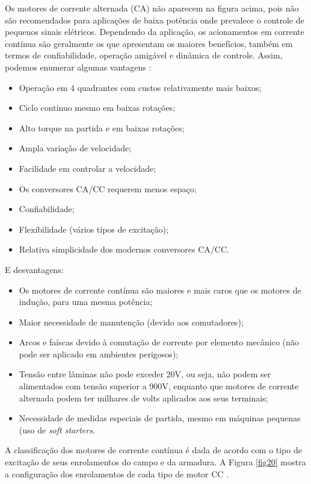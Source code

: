 \begin{anexosenv}
Os motores de corrente alternada (CA) não aparecem na figura acima, pois não são recomendados para aplicações de baixa potência onde prevalece o controle de pequenos sinais elétricos. Dependendo da aplicação, os acionamentos em corrente contínua são geralmente os que apresentam os maiores benefícios, também em termos de confiabilidade, operação amigável e dinâmica de controle. Assim, podemos enumerar algumas vantagens \cite{siemens}:
\begin{itemize}
	\item Operação em 4 quadrantes com custos relativamente mais baixos; 
	\item Ciclo contínuo mesmo em baixas rotações;
	\item Alto torque na partida e em baixas rotações;
	\item Ampla variação de velocidade;
	\item Facilidade em controlar a velocidade;
	\item Os conversores CA/CC requerem menos espaço;
	\item Confiabilidade;
	\item Flexibilidade (vários tipos de excitação);
	\item Relativa simplicidade dos modernos conversores CA/CC.
\end{itemize}

E desvantagens:
\begin{itemize}
	\item Os motores de corrente contínua são maiores e mais caros que os motores de indução, para uma mesma potência;
	\item Maior necessidade de manutenção (devido aos comutadores);
	\item Arcos e faíscas devido à comutação de corrente por elemento mecânico (não pode ser aplicado em ambientes perigosos);
	\item Tensão entre lâminas não pode exceder 20V, ou seja, não podem ser alimentados com tensão superior a 900V, enquanto que motores de corrente alternada podem ter milhares de volts aplicados aos seus terminais;
	\item Necessidade de medidas especiais de partida, mesmo em máquinas pequenas (uso de \textit{soft starters}.
\end{itemize}

A classificação dos motores de corrente contínua é dada de acordo com o tipo de excitação de seus enrolamentos do campo e da armadura. A Figura \ref{fig20} mostra a configuração dos enrolamentos de cada tipo de motor CC \cite{siteeducation}.


\end{anexosenv}
